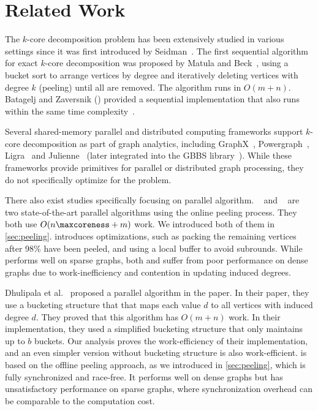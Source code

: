 \section{Related Work}
The $k$-core decomposition problem has been extensively studied in various settings since it was first introduced by Seidman~\cite{seidman1983network}.
The first sequential algorithm for exact $k$-core decomposition was proposed by Matula and Beck~\cite{matula1983smallest},
using a bucket sort to arrange vertices by degree and iteratively deleting vertices with degree $k$ (peeling) until all are removed.
The algorithm runs in $O(m + n)$.
Batagelj and Zaversnik (\BZ) provided a sequential implementation that also runs within the same time complexity~\cite{batagelj2003m}. 

Several shared-memory parallel and distributed computing frameworks support $k$-core decomposition as part of graph analytics,
including GraphX~\cite{gonzalez2014graphx}, Powergraph~\cite{gonzalez2012powergraph}, Ligra~\cite{shun2013ligra} and Julienne~\cite{dhulipala2017} (later integrated into the GBBS library~\cite{gbbs2021}).
While these frameworks provide primitives for parallel or distributed graph processing, 
they do not specifically optimize for the \kcore{} problem.

There also exist studies specifically focusing on parallel \kcore{} algorithm. 
\ParK~\cite{dasari2014park} and \PKC~\cite{kabir2017parallel} are two state-of-the-art parallel algorithms using the online peeling process. 
They both use $O(n \maxcoreness + m)$ work. 
We introduced both of them in \cref{sec:peeling}. 
\PKC{} introduces optimizations, such as packing the remaining vertices after 98\% have been peeled, 
and using a local buffer to avoid subrounds.
While \PKC{} performs well on sparse graphs, 
both \Park{} and \PKC{} suffer from poor performance on dense graphs due to work-inefficiency and contention in updating induced degrees.

Dhulipala et al.~\cite{dhulipala2017} proposed a parallel \kcore{} algorithm in the \Julienne{} paper. 
In their paper, they use a bucketing structure that that maps each value $d$ to all vertices with induced degree $d$.
They proved that this algorithm has $O(m+n)$ work. In their implementation, they used a simplified bucketing structure that only 
maintains up to $b$ buckets. Our analysis proves the work-efficiency of their implementation, 
and an even simpler version without bucketing structure is also work-efficient. 
\Julienne{} is based on the offline peeling approach, 
as we introduced in \cref{sec:peeling},
which is fully synchronized and race-free. 
It performs well on dense graphs but has unsatisfactory performance on sparse graphs, 
where synchronization overhead can be comparable to the computation cost.

